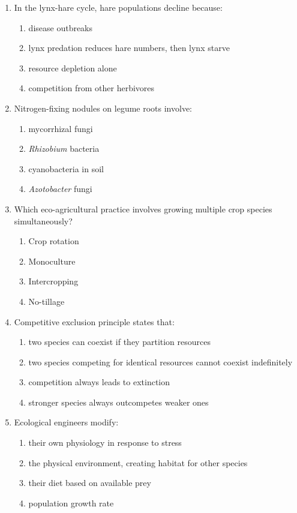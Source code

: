 \documentclass[11pt]{article}
\begin{document}
\begin{enumerate}[label=\textbf{\arabic*.}]
\item In the lynx-hare cycle, hare populations decline because:
\begin{enumerate}[label=\Alph*.]
  \item disease outbreaks
  \item lynx predation reduces hare numbers, then lynx starve
  \item resource depletion alone
  \item competition from other herbivores
\end{enumerate}

\item Nitrogen-fixing nodules on legume roots involve:
\begin{enumerate}[label=\Alph*.]
  \item mycorrhizal fungi
  \item \textit{Rhizobium} bacteria
  \item cyanobacteria in soil
  \item \textit{Azotobacter} fungi
\end{enumerate}

\item Which eco-agricultural practice involves growing multiple crop species simultaneously?
\begin{enumerate}[label=\Alph*.]
  \item Crop rotation
  \item Monoculture
  \item Intercropping
  \item No-tillage
\end{enumerate}

\item Competitive exclusion principle states that:
\begin{enumerate}[label=\Alph*.]
  \item two species can coexist if they partition resources
  \item two species competing for identical resources cannot coexist indefinitely
  \item competition always leads to extinction
  \item stronger species always outcompetes weaker ones
\end{enumerate}

\item Ecological engineers modify:
\begin{enumerate}[label=\Alph*.]
  \item their own physiology in response to stress
  \item the physical environment, creating habitat for other species
  \item their diet based on available prey
  \item population growth rate
\end{enumerate}


\end{enumerate}
\end{document}
